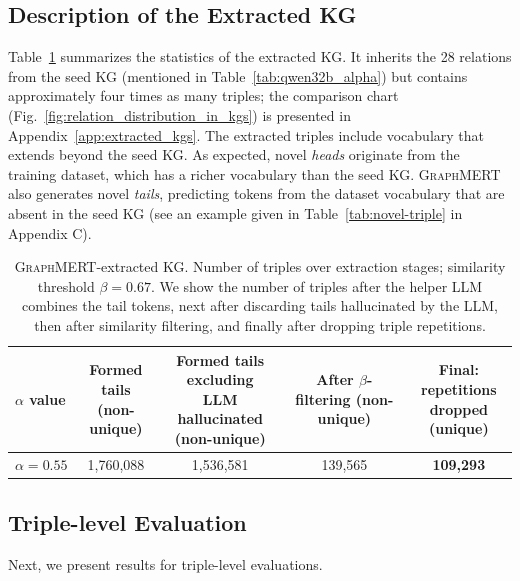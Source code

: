 \documentclass[10pt]{article}
\newcommand{\ours}{\textsc{GraphMERT}\xspace}
\begin{document}
\subsection{Description of the Extracted KG}
\label{subsec:kg_descritption}

Table~\ref{tab:extracted-kgs-stats} summarizes the statistics of the extracted KG. It inherits the 28 relations from the seed KG (mentioned in Table~\ref{tab:qwen32b_alpha}) but contains approximately four times as many triples; the comparison chart (Fig.~\ref{fig:relation_distribution_in_kgs}) is presented in Appendix~\ref{app:extracted_kgs}. The extracted triples include vocabulary that extends beyond the seed KG. As expected, novel \textit{heads} originate from the training dataset, which has a richer vocabulary than the seed KG. \ours also generates novel \textit{tails}, predicting tokens from the dataset vocabulary that are absent in the seed KG (see an example given in Table~\ref{tab:novel-triple} in Appendix C).  

\begin{table}[t]
\centering
\caption{\ours-extracted KG. Number of triples over extraction stages; similarity threshold $\beta=0.67$. We show the number of triples after the helper LLM combines the tail tokens, next after discarding tails hallucinated by the LLM, then after similarity filtering, and finally after dropping triple repetitions.}
\label{tab:extracted-kgs-stats}
\begin{tabular}{lcccc}
\toprule
\rowcolor{gray!30}
$\alpha$ value
 & \makecell{Formed tails\\(non-unique)}
 & \makecell{Formed tails excluding \\ LLM hallucinated\\(non-unique)}
 & \makecell{After $\beta$-filtering\\(non-unique)}
 & \makecell{Final: repetitions\\ dropped (unique)} \\
\midrule
$\alpha = 0.55$ & 1,760,088 & 1,536,581 & 139,565 & \textbf{109,293}\\
\bottomrule
\end{tabular}
\end{table}

\subsection{Triple-level Evaluation}
\label{subsec:factsocre_validity}

Next, we present results for triple-level evaluations.
\end{document}
